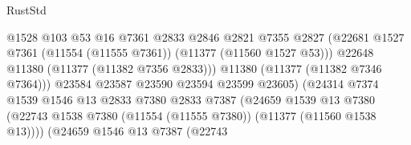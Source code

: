 \begin{lexlean}{RustStd}
\begin{coremodule}
                                              @1528
                                              @103
                                              @53
                                              @16
                                              @7361
                                              @2833
                                              @2846
                                              @2821
                                              @7355
                                              @2827
                                              (@22681
                                                @1527
                                                @7361
                                                (@11554 (@11555 @7361))
                                                (@11377 (@11560 @1527 @53)))
                                              @22648
                                              @11380
                                              (@11377 (@11382 @7356 @2833)))
                                            @11380
                                            (@11377 (@11382 @7346 @7364)))
                                          @23584
                                          @23587
                                          @23590
                                          @23594
                                          @23599
                                          @23605)
                                        (@24314
                                          @7374
                                          @1539
                                          @1546
                                          @13
                                          @2833
                                          @7380
                                          @2833
                                          @7387
                                          (@24659
                                            @1539
                                            @13
                                            @7380
                                            (@22743
                                              @1538
                                              @7380
                                              (@11554 (@11555 @7380))
                                              (@11377 (@11560 @1538 @13))))
                                          (@24659
                                            @1546
                                            @13
                                            @7387
                                            (@22743

\end{coremodule}
\end{lexlean}
